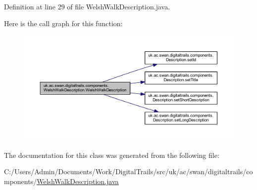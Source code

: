 Definition at line 29 of file Welsh\+Walk\+Description.\+java.



Here is the call graph for this function\+:\nopagebreak
\begin{figure}[H]
\begin{center}
\leavevmode
\includegraphics[width=350pt]{classuk_1_1ac_1_1swan_1_1digitaltrails_1_1components_1_1_welsh_walk_description_a27635e3b6262e73d473ddaa9ffccad91_cgraph}
\end{center}
\end{figure}




The documentation for this class was generated from the following file\+:\begin{DoxyCompactItemize}
\item 
C\+:/\+Users/\+Admin/\+Documents/\+Work/\+Digital\+Trails/src/uk/ac/swan/digitaltrails/components/\hyperlink{_welsh_walk_description_8java}{Welsh\+Walk\+Description.\+java}\end{DoxyCompactItemize}
